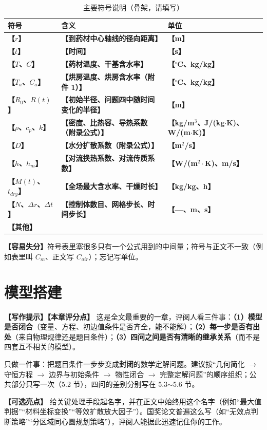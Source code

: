 \documentclass[12pt,a4paper]{article}
\newcommand{\prompt}[1]{\par\noindent\textbf{【写作提示】}#1\par}      %
\newcommand{\pitfall}[1]{\par\noindent\textbf{【容易失分】}#1\par}     %
\newcommand{\ph}[1]{\textbf{【#1】}}                                   %
\begin{document}
\begin{table}[H]
\centering
\caption{主要符号说明（骨架，请填写）}
\label{tab:symbol}
\begin{tabular}{p{2.4cm}p{9.0cm}p{2.6cm}}
\toprule
符号 & 含义 & 单位\\
\midrule
\ph{$r$} & \ph{到药材中心轴线的径向距离} & \ph{m}\\
\ph{$t$} & \ph{时间} & \ph{s}\\
\ph{$T$、$C$} & \ph{药材温度、干基含水率} & \ph{$^\circ$C、kg/kg}\\
\ph{$T_a$、$C_a$} & \ph{烘房温度、烘房含水率（附件 1）} & \ph{$^\circ$C、kg/kg}\\
\ph{$R_0$、$R(t)$} & \ph{初始半径、问题四中随时间变化的半径} & \ph{m}\\
\ph{$\rho$、$c_p$、$k$} & \ph{密度、比热容、导热系数（附录公式）} & \ph{kg/m$^3$、J/(kg$\cdot$K)、W/(m$\cdot$K)}\\
\ph{$D$} & \ph{水分扩散系数（附录公式）} & \ph{m$^2$/s}\\
\ph{$h$、$h_m$} & \ph{对流换热系数、对流传质系数} & \ph{W/(m$^2\cdot$K)、m/s}\\
\ph{$M(t)$、$t_{dry}$} & \ph{全场最大含水率、干燥时长} & \ph{kg/kg、h}\\
\ph{$N$、$\Delta r$、$\Delta t$} & \ph{控制体数目、网格步长、时间步长} & \ph{---、m、s}\\
\ph{其他} & & \\
\bottomrule
\end{tabular}
\end{table}

\pitfall{符号表里塞很多只有一个公式用到的中间量；符号与正文不一致（例如表里叫 $C_m$、正文写 $C_{air}$）；忘记写单位。}

\clearpage

\section{模型搭建}

\prompt{\textbf{【本章评分点】} 这是全文最重要的一章，评阅人看三件事：\textbf{（1）模型是否闭合}（变量、方程、初边值条件是否齐全，能不能解）；\textbf{（2）每一步是否有出处}（来自物理规律还是题目条件）；\textbf{（3）四问之间是否有清晰的继承关系}（而不是四套互不相关的模型）。

只做一件事：把题目条件一步步变成\textbf{封闭}的数学定解问题。建议按“几何简化 $\rightarrow$ 守恒方程 $\rightarrow$ 边界与初始条件 $\rightarrow$ 物性闭合 $\rightarrow$ 完整定解问题”的顺序组织；公共部分只写一次（5.2 节），四问的差别分别写在 5.3$\sim$5.6 节。

\textbf{【可选亮点】} 给关键处理手段起名字，并在正文中始终用这个名字（例如“最大值判据”“材料坐标变换”“等效扩散放大因子”）。国奖论文普遍这么写（如“无效点判断策略”“分区域同心圆规划策略”），评阅人能据此迅速记住你的工作。}
\end{document}
